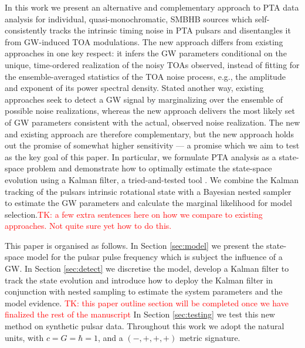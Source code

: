 \documentclass[fleqn,usenatbib,useAMS]{mnras}
\begin{document}
In this work we present an alternative and complementary approach to PTA data analysis for individual, quasi-monochromatic, SMBHB sources which self-consistently tracks the intrinsic timing noise in PTA pulsars and disentangles it from GW-induced TOA modulations. The new approach differs from existing approaches in one key respect: it infers the GW parameters conditional on the unique, time-ordered realization of the noisy TOAs observed, instead of fitting for the ensemble-averaged statistics of the TOA noise process, e.g., the amplitude and exponent of its power spectral density. Stated another way, existing approaches seek to detect a GW signal by marginalizing over the ensemble of possible noise realizations, whereas the new approach delivers the most likely set of GW parameters consistent with the actual, observed noise realization. The new and existing approach are therefore complementary, but the new approach holds out the promise of somewhat higher sensitivity --- a promise which we aim to test as the key goal of this paper. In particular, we formulate PTA analysis as a state-space problem and demonstrate how to optimally estimate the state-space evolution using a Kalman filter, a tried-and-tested tool \citep{Kalman1,Meyers2021,Melatos2023}. We combine the Kalman tracking of the pulsars intrinsic rotational state with a Bayesian nested sampler \citep{Skilling, Ashton2022} to estimate the GW parameters and calculate the marginal likelihood for model selection.\textcolor{red}{TK: a few extra sentences here on how we compare to existing approaches. Not quite sure yet how to do this.} \newline 
 


\noindent This paper is organised as follows. In Section \ref{sec:model} we present the state-space model for the pulsar pulse frequency which is subject the influence of a GW. In Section \ref{sec:detect} we discretise the model, develop a Kalman filter to track the state evolution and introduce how to deploy the Kalman filter in conjunction with nested sampling to estimate the system parameters and the model evidence. \textcolor{red}{TK: this paper outline section will be completed once we have finalized the rest of the manuscript} In Section \ref{sec:testing} we test this new method on synthetic pulsar data. Throughout this work we adopt the natural units, with $c = G = \hbar = 1$, and a $(-,+,+,+)$ metric signature. \newline 
\end{document}
